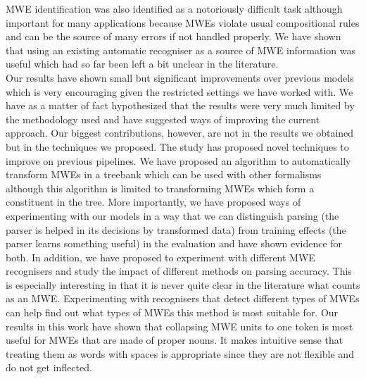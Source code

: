 \documentclass[output=paper]{langsci/langscibook}
\begin{document}
\indent MWE identification was also identified as a notoriously difficult task although important for many applications because MWEs violate usual compositional ru\-les and can be the source of many errors if not handled properly. We have shown that using an existing automatic recogniser as a source of MWE information was useful which had so far been left a bit unclear in the literature. \\
\indent Our results have shown small but significant improvements over previous models which is very encouraging given the restricted settings we have worked with. We have as a matter of fact hypothesized that the results were very much limited by the methodology used and have suggested ways of improving the current approach. Our biggest contributions, however, are not in the results we obtained but in the techniques we proposed. The study has proposed novel techniques to improve on previous pipelines. We have proposed an algorithm to automatically transform MWEs in a treebank which can be used with other formalisms although this algorithm is limited to transforming MWEs which form a constituent in the tree. More importantly, we have proposed ways of experimenting with our models in a way that we can distinguish parsing (the parser is helped in its decisions by transformed data) from training effects (the parser learns something useful) in the evaluation and have shown evidence for both. In addition, we have proposed to experiment with different MWE recognisers and study the impact of different  methods on parsing accuracy. This is especially interesting in that it is never quite clear in the literature what counts as an MWE. Experimenting with recognisers that detect different types of MWEs can help find out what types of MWEs this method is most suitable for. Our results in this work have shown that collapsing MWE units to one token is most useful for MWEs that are made of proper nouns. It makes intuitive sense that treating them as words with spaces is appropriate since they are not flexible and do not get inflected.
\end{document}
